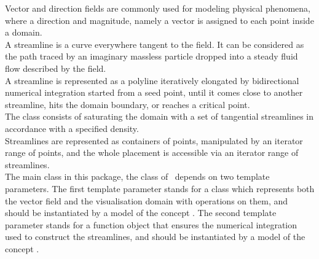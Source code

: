 
\label{ref_chapter_2D_Streamlines}




Vector and direction fields are commonly used for modeling physical
phenomena, where a direction and magnitude, namely a vector is assigned to
each point inside a domain.\\

A streamline is a curve everywhere tangent to the field. It can be
considered as the path traced by an imaginary massless particle
dropped into a steady fluid flow described by the field.\\

A streamline is represented as a polyline iteratively elongated by
bidirectional numerical integration started from a seed point, until
it comes close to another streamline, hits the domain boundary, or
reaches a critical point.\\

The  class consists of saturating the domain with
a set of tangential streamlines in accordance with a specified
density.\\

Streamlines are represented as containers of points, manipulated by an
iterator range of points, and the whole placement is accessible via an
iterator range of streamlines.\\

The main class in this package, the  class of \cgal\ depends on two template
parameters.  The first template parameter stands for a class which
represents both the vector field and the visualisation domain with
operations on them, and should be instantiated by a model of the concept
.  The second template parameter stands for a
function object that ensures the numerical integration used to
construct the streamlines, and should be instantiated by a model of the concept
.

